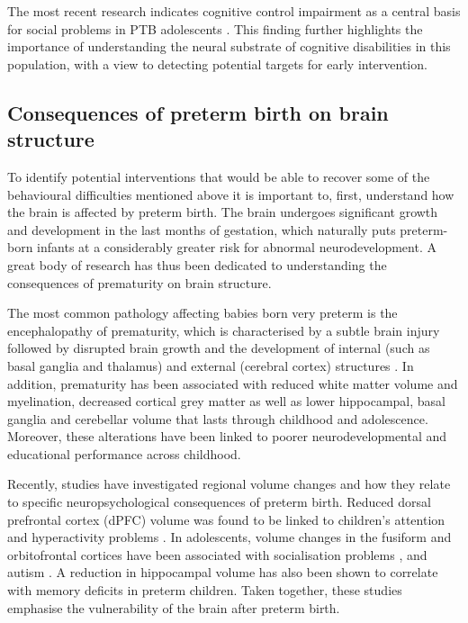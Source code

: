 The most recent research indicates cognitive control impairment as a central basis for social problems in PTB adolescents \citep{Twilhaar2019}. This finding further highlights the importance of understanding the neural substrate of cognitive disabilities in this population, with a view to detecting potential targets for early intervention. 


\subsection{Consequences of preterm birth on brain structure}

To identify potential interventions that would be able to recover some of the behavioural difficulties mentioned above it is important to, first, understand how the brain is affected by preterm birth. The brain undergoes significant growth and development in the last months of gestation, which naturally puts preterm-born infants at a considerably greater risk for abnormal neurodevelopment. A great body of research has thus been dedicated to understanding the consequences of prematurity on brain structure.

The most common pathology affecting babies born very preterm is the encephalopathy of prematurity, which is characterised by a subtle brain injury followed by disrupted brain growth and the development of internal (such as basal ganglia and thalamus) and external (cerebral cortex) structures \citep{Kunz2014}. In addition, prematurity has been associated with reduced white matter volume and myelination, decreased cortical grey matter as well as lower hippocampal, basal ganglia and cerebellar volume that lasts through childhood and adolescence. Moreover, these alterations have been linked to poorer neurodevelopmental \citep{Inder2005,Ment2009,Nosarti2013,Padilla2015} and educational \citep{Cheong2013} performance across childhood.

 Recently, studies have investigated regional volume changes and how they relate to specific neuropsychological consequences of preterm birth. Reduced dorsal prefrontal cortex (dPFC) volume was found to be linked to children's attention and hyperactivity problems \citep{Bora2014}. In adolescents, volume changes in the fusiform and orbitofrontal cortices have been associated with socialisation problems \citep{Healy2013}, and autism \citep{Johnson2014}. A reduction in hippocampal volume has also been shown to correlate with memory deficits in preterm children. Taken together, these studies emphasise the vulnerability of the brain after preterm birth.


